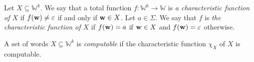 \begin{definition}
	Let \( X \subseteq \mathbb W^k \).
	We say that a total function \( f \colon \mathbb W^k \to \mathbb W \) is \emph{a characteristic function of \( X \)} if \( f(\vb w) \neq \varepsilon \) if and only if \( \vb w \in X \).
	Let \( a \in \Sigma \).
	We say that \( f \) is \emph{the characteristic function of \( X \)} if \( f(\vb w) = a \) if \( \vb w \in X \) and \( f(\vb w) = \varepsilon \) otherwise.
\end{definition}
\begin{definition}
	A set of words \( X \subseteq \mathbb W^k \) is \emph{computable} if the characteristic function \( \chi_X \) of \( X \) is computable.
\end{definition}
